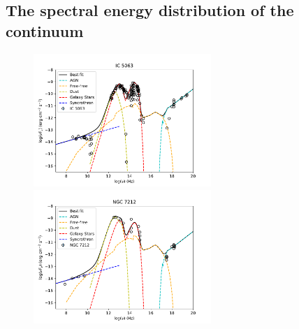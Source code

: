 \documentclass[../main.tex]{subfiles}
\begin{document}
\subsection{The spectral energy distribution of the continuum}

\begin{figure}
\centering
\includegraphics[width=0.6\textwidth]{images/paper1/sedic50n.pdf}\\
\includegraphics[width=0.6\textwidth]{images/paper1/sedn72n.pdf}

\end{figure}
\end{document}
